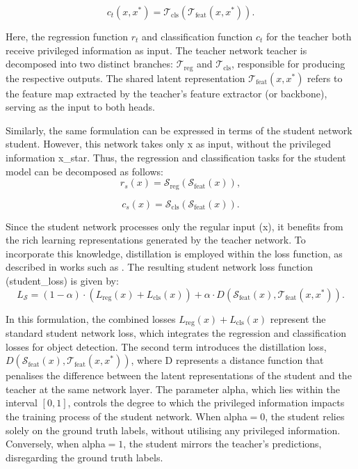 \begin{equation} \label{eq:teacher_network_cls}
c_t(x, x^*) = \mathcal{T}_{\text{cls}}(\mathcal{T}_{\text{feat}}(x, x^*)) .
\end{equation}

\noindent Here, the regression function \( r_t \) and classification function \( c_t \) for the teacher both receive privileged information as input. The teacher network \gls{teacher} is decomposed into two distinct branches: \( \mathcal{T}_{\text{reg}} \) and \( \mathcal{T}_{\text{cls}} \), responsible for producing the respective outputs. The shared latent representation \( \mathcal{T}_{\text{feat}}(x, x^*) \) refers to the feature map extracted by the teacher’s feature extractor (or backbone), serving as the input to both heads.

Similarly, the same formulation can be expressed in terms of the student network \gls{student}. However, this network takes only \gls{x} as input, without the privileged information \gls{x_star}. Thus, the regression and classification tasks for the student model can be decomposed as follows:
\begin{equation} \label{eq:student_network_reg}
r_s(x) = \mathcal{S}_{\text{reg}}(\mathcal{S}_{\text{feat}}(x)),
\end{equation}

\begin{equation} \label{eq:student_network_cls}
c_s(x) = \mathcal{S}_{\text{cls}}(\mathcal{S}_{\text{feat}}(x)).
\end{equation}

\noindent Since the student network processes only the regular input (\gls{x}), it benefits from the rich learning representations generated by the teacher network. To incorporate this knowledge, distillation is employed within the loss function, as described in works such as \cite{lab2wild, lupi, lupi_distillation}. The resulting student network loss function (\gls{student_loss}) is given by:
\begin{equation} \label{eq:lupi_loss_function}
L_{\mathcal{S}} = (1 - \alpha) \cdot ( L_{\text{reg}}(x) + L_{\text{cls}}(x)) + \alpha \cdot D(\mathcal{S}_{\text{feat}}(x), \mathcal{T}_{\text{feat}}(x, x^*)).
\end{equation}

\noindent In this formulation, the combined losses \( L_{\text{reg}}(x) + L_{\text{cls}}(x) \) represent the standard student network loss, which integrates the regression and classification losses for object detection. The second term introduces the distillation loss, \( D(\mathcal{S}_{\text{feat}}(x), \mathcal{T}_{\text{feat}}(x, x^*)) \), where \gls{D} represents a distance function that penalises the difference between the latent representations of the student and the teacher at the same network layer. The parameter \gls{alpha}, which lies within the interval \( [0, 1] \), controls the degree to which the privileged information impacts the training process of the student network. When \gls{alpha}$=0$, the student relies solely on the ground truth labels, without utilising any privileged information. Conversely, when \gls{alpha}$=1$, the student mirrors the teacher's predictions, disregarding the ground truth labels.

